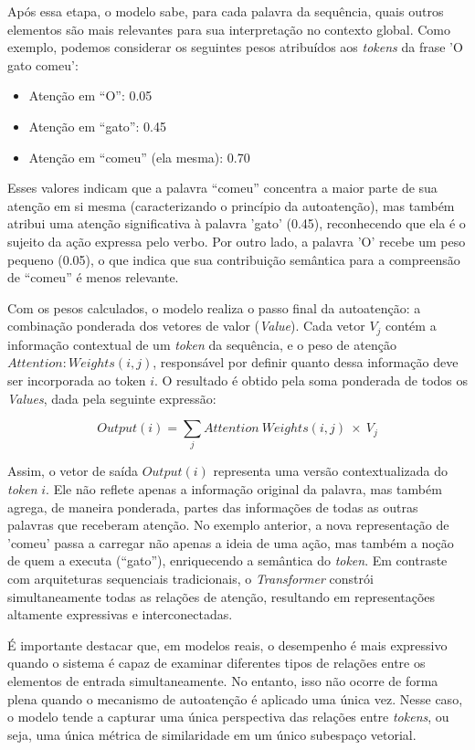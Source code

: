 Após essa etapa, o modelo sabe, para cada palavra da sequência, quais outros elementos são mais relevantes para sua interpretação no contexto global. Como exemplo, podemos considerar os seguintes pesos atribuídos aos \textit{tokens} da frase 'O gato comeu':

\begin{itemize}
\item Atenção em “O”: 0.05
\item Atenção em “gato”: 0.45
\item Atenção em “comeu” (ela mesma): 0.70
\end{itemize}

Esses valores indicam que a palavra “comeu” concentra a maior parte de sua atenção em si mesma (caracterizando o princípio da autoatenção), mas também atribui uma atenção significativa à palavra 'gato' (0.45), reconhecendo que ela é o sujeito da ação expressa pelo verbo. Por outro lado, a palavra 'O' recebe um peso pequeno (0.05), o que indica que sua contribuição semântica para a compreensão de “comeu” é menos relevante. 

Com os pesos calculados, o modelo realiza o passo final da autoatenção: a combinação ponderada dos vetores de valor (\textit{Value}). Cada vetor $V_j$ contém a informação contextual de um \textit{token} da sequência, e o peso de atenção $Attention : Weights(i,j)$, responsável por definir quanto dessa informação deve ser incorporada ao token $i$. O resultado é obtido pela soma ponderada de todos os \textit{Values}, dada pela seguinte expressão:

\begin{equation}
    Output(i) = \sum_j Attention \: Weights(i,j) \: \times \: V_j
\end{equation}

Assim, o vetor de saída $Output(i)$ representa uma versão contextualizada do \textit{token} $i$. Ele não reflete apenas a informação original da palavra, mas também agrega, de maneira ponderada, partes das informações de todas as outras palavras que receberam atenção. No exemplo anterior, a nova representação de 'comeu' passa a carregar não apenas a ideia de uma ação, mas também a noção de quem a executa (“gato”), enriquecendo a semântica do \textit{token}. Em contraste com arquiteturas sequenciais tradicionais, o \textit{Transformer} constrói simultaneamente todas as relações de atenção, resultando em representações altamente expressivas e interconectadas.

É importante destacar que, em modelos reais, o desempenho é mais expressivo quando o sistema é capaz de examinar diferentes tipos de relações entre os elementos de entrada simultaneamente. No entanto, isso não ocorre de forma plena quando o mecanismo de autoatenção é aplicado uma única vez. Nesse caso, o modelo tende a capturar uma única perspectiva das relações entre \textit{tokens}, ou seja, uma única métrica de similaridade em um único subespaço vetorial. 

